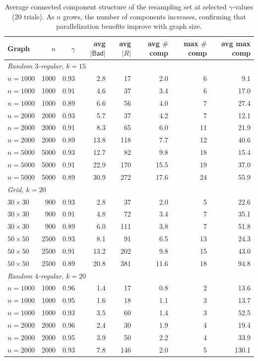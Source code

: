 \documentclass[12pt, a4paper]{article}
\theoremstyle{plain}
\theoremstyle{definition}
\theoremstyle{remark}
\newcommand{\bad}{\mathsf{Bad}}
\begin{document}
\begin{table}[ht]
\centering\small
\begin{tabular}{l r r | r r r r r}
\hline
Graph & \(n\) & \(\gamma\) & avg \(|\bad|\) & avg \(|R|\) & avg \(\#\)comp & max \(\#\)comp & avg max comp \\
\hline
\multicolumn{8}{l}{\em Random \(3\)-regular, \(k=15\)} \\
\(n\!=\!1000\) & 1000 & 0.93 & 2.8 & 17 & 2.0 & 6 & 9.1 \\
\(n\!=\!1000\) & 1000 & 0.91 & 4.6 & 37 & 3.4 & 6 & 17.0 \\
\(n\!=\!1000\) & 1000 & 0.89 & 6.6 & 56 & 4.0 & 7 & 27.4 \\
\(n\!=\!2000\) & 2000 & 0.93 & 5.7 & 37 & 4.2 & 7 & 12.1 \\
\(n\!=\!2000\) & 2000 & 0.91 & 8.3 & 65 & 6.0 & 11 & 21.9 \\
\(n\!=\!2000\) & 2000 & 0.89 & 13.8 & 118 & 7.7 & 12 & 40.6 \\
\(n\!=\!5000\) & 5000 & 0.93 & 12.7 & 82 & 9.8 & 18 & 15.4 \\
\(n\!=\!5000\) & 5000 & 0.91 & 22.9 & 170 & 15.5 & 19 & 37.0 \\
\(n\!=\!5000\) & 5000 & 0.89 & 30.9 & 272 & 17.6 & 24 & 55.9 \\
\hline
\multicolumn{8}{l}{\em Grid, \(k=20\)} \\
\(30\!\times\!30\) & 900 & 0.93 & 2.8 & 37 & 2.0 & 5 & 22.6 \\
\(30\!\times\!30\) & 900 & 0.91 & 4.8 & 72 & 3.4 & 7 & 35.1 \\
\(30\!\times\!30\) & 900 & 0.89 & 6.0 & 111 & 3.8 & 7 & 51.8 \\
\(50\!\times\!50\) & 2500 & 0.93 & 8.1 & 91 & 6.5 & 13 & 24.3 \\
\(50\!\times\!50\) & 2500 & 0.91 & 13.2 & 202 & 9.8 & 15 & 43.0 \\
\(50\!\times\!50\) & 2500 & 0.89 & 20.8 & 381 & 11.6 & 18 & 94.8 \\
\hline
\multicolumn{8}{l}{\em Random \(4\)-regular, \(k=20\)} \\
\(n\!=\!1000\) & 1000 & 0.96 & 1.4 & 17 & 0.8 & 2 & 13.6 \\
\(n\!=\!1000\) & 1000 & 0.95 & 1.6 & 18 & 1.1 & 3 & 13.7 \\
\(n\!=\!1000\) & 1000 & 0.93 & 3.5 & 60 & 1.4 & 3 & 52.5 \\
\(n\!=\!2000\) & 2000 & 0.96 & 2.4 & 30 & 1.9 & 4 & 19.4 \\
\(n\!=\!2000\) & 2000 & 0.95 & 3.9 & 50 & 2.2 & 4 & 33.9 \\
\(n\!=\!2000\) & 2000 & 0.93 & 7.8 & 146 & 2.0 & 5 & 130.1 \\
\hline
\end{tabular}
\caption{Average connected component structure of the resampling set at selected \(\gamma\)-values (20 trials). As \(n\) grows, the number of components increases, confirming that parallelization benefits improve with graph size.}
\label{tab:components}
\end{table}
\end{document}
